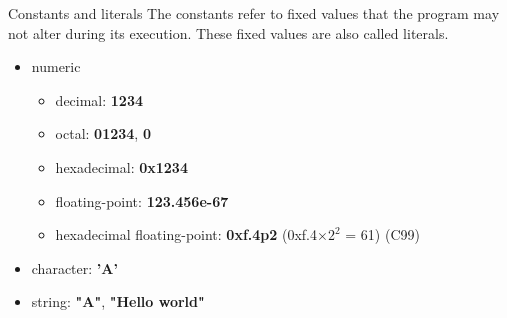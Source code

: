 \begin{frame}{Constants and literals}
    The constants refer to fixed values that the program may not alter during its execution. These fixed values are also called literals.
    \begin{itemize}
        \item numeric
            \begin{itemize}
                \item decimal: \textbf{1234}
                \item octal: \textbf{01234}, \textbf{0}
                \item hexadecimal: \textbf{0x1234}
                \item floating-point: \textbf{123.456e-67}
                \item hexadecimal floating-point: \textbf{0xf.4p2} (0xf.4$\times{2}^2$ = 61) (C99)
            \end{itemize}
        \item character: \textbf{'A'}
        \item string: \textbf{"A"}, \textbf{"Hello world"}
    \end{itemize}
\end{frame}
